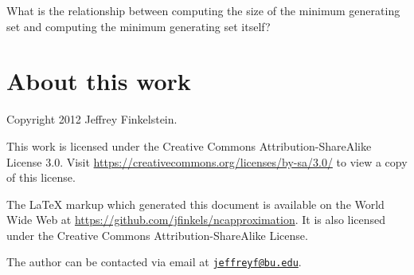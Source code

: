 \documentclass{article}
\newcommand{\email}[1]{\href{mailto:#1}{\nolinkurl{#1}}}
\begin{document}
What is the relationship between computing the size of the minimum generating set and computing the minimum generating set itself?

\section{About this work}

Copyright 2012 Jef{}frey Finkelstein.

This work is licensed under the Creative Commons Attribution-ShareAlike License 3.0.
Visit \mbox{\url{https://creativecommons.org/licenses/by-sa/3.0/}} to view a copy of this license.

The \LaTeX{} markup which generated this document is available on the World Wide Web at \mbox{\url{https://github.com/jfinkels/ncapproximation}}.
It is also licensed under the Creative Commons Attribution-ShareAlike License.

The author can be contacted via email at \email{jeffreyf@bu.edu}.




\appendix

\end{document}
